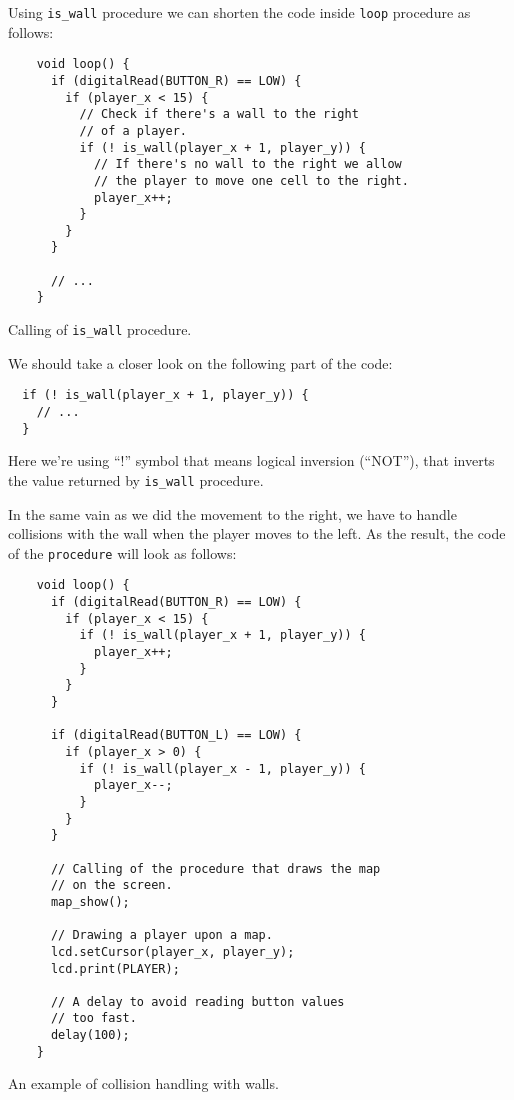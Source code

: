 \documentclass[../sparc.tex]{subfiles}
\begin{document}

Using \texttt{is_wall} procedure we can shorten the code inside
\texttt{loop} procedure as follows:

\begin{listing}[H]
  \begin{verbatim}
    void loop() {
      if (digitalRead(BUTTON_R) == LOW) {
        if (player_x < 15) {
          // Check if there's a wall to the right
          // of a player.
          if (! is_wall(player_x + 1, player_y)) {
            // If there's no wall to the right we allow
            // the player to move one cell to the right.
            player_x++;
          }
        }
      }

      // ...
    }
  \end{verbatim}
  \caption{Calling of \texttt{is_wall} procedure.}
  \label{listing:game-dev-map-collisions-02}
\end{listing}

We should take a closer look on the following part of the code:

\begin{verbatim}
  if (! is_wall(player_x + 1, player_y)) {
    // ...
  }
\end{verbatim}

Here we're using ``!'' symbol that means logical inversion (``NOT''), that
inverts the value returned by \texttt{is_wall} procedure.

In the same vain as we did the movement to the right, we have to handle
collisions with the wall when the player moves to the left.  As the result, the
code of the \texttt{procedure} will look as follows:

\begin{listing}[H]
  \begin{verbatim}
    void loop() {
      if (digitalRead(BUTTON_R) == LOW) {
        if (player_x < 15) {
          if (! is_wall(player_x + 1, player_y)) {
            player_x++;
          }
        }
      }

      if (digitalRead(BUTTON_L) == LOW) {
        if (player_x > 0) {
          if (! is_wall(player_x - 1, player_y)) {
            player_x--;
          }
        }
      }

      // Calling of the procedure that draws the map
      // on the screen.
      map_show();

      // Drawing a player upon a map.
      lcd.setCursor(player_x, player_y);
      lcd.print(PLAYER);

      // A delay to avoid reading button values
      // too fast.
      delay(100);
    }
  \end{verbatim}
  \caption{An example of collision handling with walls.}
  \label{listing:game-dev-map-collisions-03}
\end{listing}
\end{document}
